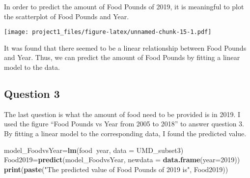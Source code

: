 \documentclass[]{article}
\newenvironment{Shaded}{\begin{snugshade}}{\end{snugshade}}
\newcommand{\CommentTok}[1]{\textcolor[rgb]{0.56,0.35,0.01}{\textit{#1}}}
\newcommand{\DataTypeTok}[1]{\textcolor[rgb]{0.13,0.29,0.53}{#1}}
\newcommand{\DecValTok}[1]{\textcolor[rgb]{0.00,0.00,0.81}{#1}}
\newcommand{\KeywordTok}[1]{\textcolor[rgb]{0.13,0.29,0.53}{\textbf{#1}}}
\newcommand{\NormalTok}[1]{#1}
\newcommand{\OperatorTok}[1]{\textcolor[rgb]{0.81,0.36,0.00}{\textbf{#1}}}
\newcommand{\StringTok}[1]{\textcolor[rgb]{0.31,0.60,0.02}{#1}}
\begin{document}
In order to predict the amount of Food Pounds of 2019, it is meaningful
to plot the scatterplot of Food Pounds and Year.

\begin{Shaded}
\end{Shaded}

\texttt{[image: project1\_files/figure-latex/unnamed-chunk-15-1.pdf]}

It was found that there seemed to be a linear relationship between Food
Pounds and Year. Thus, we can predict the amount of Food Pounds by
fitting a linear model to the data.

\hypertarget{question-3}{%
\subsection{Question 3}\label{question-3}}

The last question is what the amount of food need to be provided is in
2019. I used the figure ``Food Pounds vs Year from 2005 to 2018'' to
answer question 3. By fitting a linear model to the corresponding data,
I found the predicted value.

\begin{Shaded}
\begin{Highlighting}[]
\NormalTok{model_FoodvsYear=}\KeywordTok{lm}\NormalTok{(food}\OperatorTok{~}\NormalTok{year, }\DataTypeTok{data =}\NormalTok{ UMD_subset3)}
\NormalTok{Food2019=}\KeywordTok{predict}\NormalTok{(model_FoodvsYear, }\DataTypeTok{newdata =} \KeywordTok{data.frame}\NormalTok{(}\DataTypeTok{year=}\DecValTok{2019}\NormalTok{))}
\KeywordTok{print}\NormalTok{(}\KeywordTok{paste}\NormalTok{(}\StringTok{"The predicted value of Food Pounds of 2019 is"}\NormalTok{, Food2019))}
\end{Highlighting}
\end{Shaded}
\end{document}
